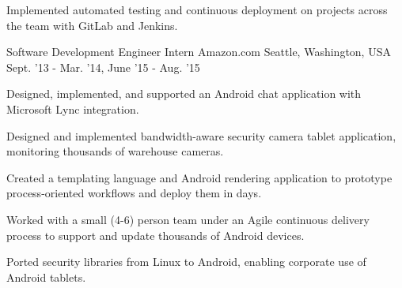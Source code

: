 \begin{cventries}
{\begin{cvitems}
            \item Implemented automated testing and continuous deployment on projects across the team with GitLab and Jenkins.
        \end{cvitems}
    }
\vspace{2mm}
\cventry
    {Software Development Engineer Intern} %
    {Amazon.com} %
    {Seattle, Washington, USA} %
    {Sept. '13 - Mar. '14,
    June '15 - Aug. '15} %
    {
        \begin{cvitems}
            \item Designed, implemented, and supported an Android chat application with Microsoft Lync integration.
            \item Designed and implemented bandwidth-aware security camera tablet application, monitoring thousands of warehouse cameras.
            \item Created a templating language and Android rendering application to prototype process-oriented workflows and deploy them in days.
            \item Worked with a small (4-6) person team under an Agile continuous delivery process to support and update thousands of Android devices.
            \item Ported security libraries from Linux to Android, enabling corporate use of Android tablets.
        \end{cvitems}
    }
\end{cventries}
